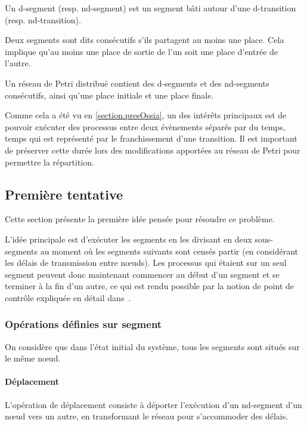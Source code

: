 \begin{mydef}[d-segment]
Un d-segment (resp. nd-segment) est un segment bâti autour d'une d-transition (resp. nd-transition).
\end{mydef}

\begin{mydef}
Deux segments sont dits consécutifs s'ils partagent au moins une place. Cela implique qu'au moins une place de sortie de l'un soit une place d'entrée de l'autre.
\end{mydef}

Un réseau de Petri distribué contient des d-segments et des nd-segments consécutifs, ainsi qu'une place initiale et une place finale.

Comme cela a été vu en \cref{section.presOssia}, un des intérêts principaux est de pouvoir exécuter des processus entre deux évènements séparés par du temps, temps qui est représenté par le franchissement d'une transition. Il est important de préserver cette durée lors des modifications apportées au réseau de Petri pour permettre la répartition.

\subsection{Première tentative}
Cette section présente la première idée pensée pour résoudre ce problème.

L'idée principale est d'exécuter les segments en les divisant en deux sous-segments au moment où les segments suivants sont censés partir (en considérant les délais de transmission entre nœuds). Les processus qui étaient sur un seul segment peuvent donc maintenant commencer au début d'un segment et se terminer à la fin d'un autre, ce qui est rendu possible par la notion de point de contrôle expliquée en détail dans~\cite[p. 73]{allombert2009aspects}.
 
\subsubsection{Opérations définies sur segment}
On considère que dans l'état initial du système, tous les segments sont situés sur le même nœud.

\paragraph{Déplacement}
L'opération de déplacement consiste à déporter l'exécution d'un nd-segment d'un nœud vers un autre, en transformant le réseau pour s'accommoder des délais.

